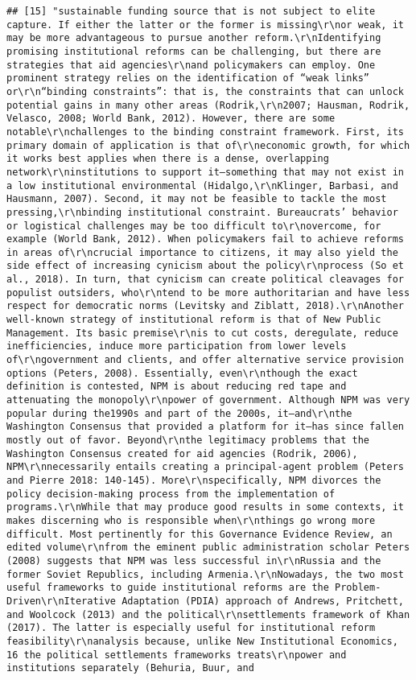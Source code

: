 \documentclass[
]{article}
\begin{document}
\begin{verbatim}
## [15] "sustainable funding source that is not subject to elite capture. If either the latter or the former is missing\r\nor weak, it may be more advantageous to pursue another reform.\r\nIdentifying promising institutional reforms can be challenging, but there are strategies that aid agencies\r\nand policymakers can employ. One prominent strategy relies on the identification of “weak links” or\r\n“binding constraints”: that is, the constraints that can unlock potential gains in many other areas (Rodrik,\r\n2007; Hausman, Rodrik, Velasco, 2008; World Bank, 2012). However, there are some notable\r\nchallenges to the binding constraint framework. First, its primary domain of application is that of\r\neconomic growth, for which it works best applies when there is a dense, overlapping network\r\ninstitutions to support it—something that may not exist in a low institutional environmental (Hidalgo,\r\nKlinger, Barbasi, and Hausmann, 2007). Second, it may not be feasible to tackle the most pressing,\r\nbinding institutional constraint. Bureaucrats’ behavior or logistical challenges may be too difficult to\r\novercome, for example (World Bank, 2012). When policymakers fail to achieve reforms in areas of\r\ncrucial importance to citizens, it may also yield the side effect of increasing cynicism about the policy\r\nprocess (So et al., 2018). In turn, that cynicism can create political cleavages for populist outsiders, who\r\ntend to be more authoritarian and have less respect for democratic norms (Levitsky and Ziblatt, 2018).\r\nAnother well-known strategy of institutional reform is that of New Public Management. Its basic premise\r\nis to cut costs, deregulate, reduce inefficiencies, induce more participation from lower levels of\r\ngovernment and clients, and offer alternative service provision options (Peters, 2008). Essentially, even\r\nthough the exact definition is contested, NPM is about reducing red tape and attenuating the monopoly\r\npower of government. Although NPM was very popular during the1990s and part of the 2000s, it—and\r\nthe Washington Consensus that provided a platform for it—has since fallen mostly out of favor. Beyond\r\nthe legitimacy problems that the Washington Consensus created for aid agencies (Rodrik, 2006), NPM\r\nnecessarily entails creating a principal-agent problem (Peters and Pierre 2018: 140-145). More\r\nspecifically, NPM divorces the policy decision-making process from the implementation of programs.\r\nWhile that may produce good results in some contexts, it makes discerning who is responsible when\r\nthings go wrong more difficult. Most pertinently for this Governance Evidence Review, an edited volume\r\nfrom the eminent public administration scholar Peters (2008) suggests that NPM was less successful in\r\nRussia and the former Soviet Republics, including Armenia.\r\nNowadays, the two most useful frameworks to guide institutional reforms are the Problem-Driven\r\nIterative Adaptation (PDIA) approach of Andrews, Pritchett, and Woolcock (2013) and the political\r\nsettlements framework of Khan (2017). The latter is especially useful for institutional reform feasibility\r\nanalysis because, unlike New Institutional Economics, 16 the political settlements frameworks treats\r\npower and institutions separately (Behuria, Buur, and 
\end{verbatim}
\end{document}
